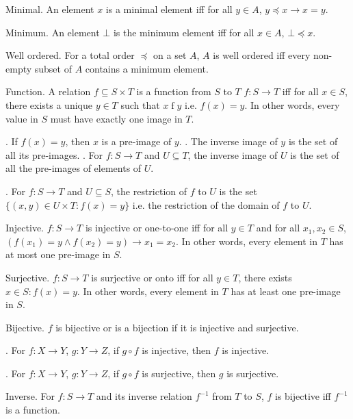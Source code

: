 \documentclass{slnotes}
\begin{document}
 Minimal. An element \(x\) is a minimal element iff for all \(y \in A\), \(y \preceq x \to x = y\).

 Minimum. An element \(\bot\) is the minimum element iff for all \(x \in A\), \(\bot \preceq x\).

 Well ordered. For a total order \(\preceq\) on a set \(A\), \(A\) is well ordered iff every non-empty subset of \(A\) contains a minimum element.

 Function. A relation \(f \subseteq S \times T\) is a function from \(S\) to \(T\) \(f : S \to T\) iff for all \(x \in S\), there exists a unique \(y \in T\) such that \(x \mathrel{f} y\) i.e. \(f(x) = y\). In other words, every value in \(S\) must have exactly one image in \(T\).

. If \(f(x) = y\), then \(x\) is a pre-image of \(y\). . The inverse image of \(y\) is the set of all its pre-images. . For \(f : S \to T\) and \(U \subseteq T\), the inverse image of \(U\) is the set of all the pre-images of elements of \(U\).

. For \(f : S \to T\) and \(U \subseteq S\), the restriction of \(f\) to \(U\) is the set \(\{(x, y) \in U \times T : f(x) = y\}\) i.e. the restriction of the domain of \(f\) to \(U\).

 Injective. \(f : S \to T\) is injective or one-to-one iff for all \(y \in T\) and for all \(x_1, x_2 \in S\), \((f(x_1) = y \land f(x_2) = y) \to x_1 = x_2\). In other words, every element in \(T\) has at most one pre-image in \(S\).

 Surjective. \(f : S \to T\) is surjective or onto iff for all \(y \in T\), there exists \(x \in S : f(x) = y\). In other words, every element in \(T\) has at least one pre-image in \(S\).

 Bijective. \(f\) is bijective or is a bijection if it is injective and surjective.

. For \(f : X \to Y\), \(g : Y \to Z\), if \(g \circ f\) is injective, then \(f\) is injective.

. For \(f : X \to Y\), \(g : Y \to Z\), if \(g \circ f\) is surjective, then \(g\) is surjective.

 Inverse. For \(f : S \to T\) and its inverse relation \(f^{-1}\) from \(T\) to \(S\), \(f\) is bijective iff \(f^{-1}\) is a function.
\end{document}

